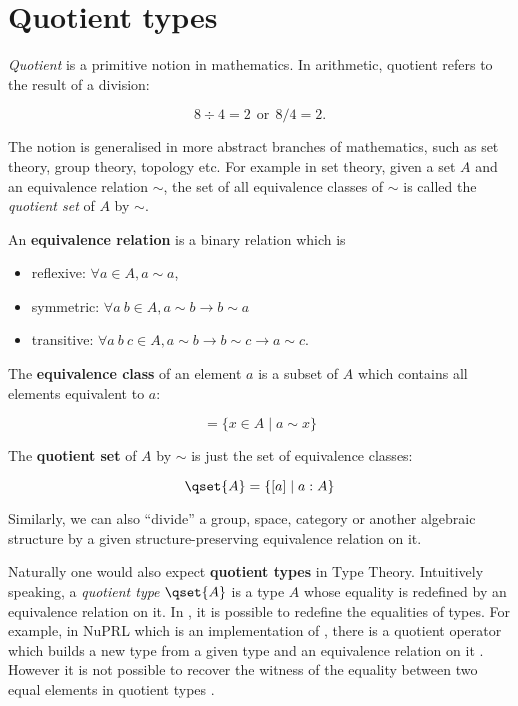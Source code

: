 



\section{Quotient types}


\emph{Quotient} is a primitive notion in mathematics. In arithmetic,
quotient refers to the result of a division:

$$8 \div 4 = 2 ~~ \text{or}~~ 8/4 = 2.$$

The notion is generalised in more abstract branches of mathematics,
such as set theory, group theory, topology etc. For example in set
theory, given a set $A$ and an equivalence relation $\sim$, the set of
all equivalence classes of $\sim$ is called the \emph{quotient set} of
$A$ by $\sim$.

An \textbf{equivalence relation} is a binary relation which is 

\begin{itemize}
\item reflexive: $\forall a \in A, a \sim a$,
\item symmetric: $\forall a~ b \in A, a \sim b \to b \sim a$
\item transitive: $\forall a ~ b~ c \in A, a \sim b \to b \sim c \to a \sim c$.
\end{itemize}

The \textbf{equivalence class} of an element $a$ is a subset of $A$
which contains all elements equivalent to $a$:

\begin{equation*}
[a] = \{x \in A \;| \; a \sim x \}
\end{equation*}

The \textbf{quotient set} of $A$ by $\sim$ is just the set of equivalence classes:

\begin{equation*}
\qset{A} = \{ [ a ] \;|\; a : A \}
\end{equation*}

Similarly, we can also ``divide'' a group, space, category or another
algebraic structure by a given structure-preserving equivalence
relation on it.

Naturally one would also expect \textbf{quotient types} in Type
Theory. Intuitively speaking, a \emph{quotient type} $\qset{A}$ is a
type $A$ whose equality is redefined by an equivalence relation on
it. In \ett, it is possible to redefine the equalities of types.  For
example, in NuPRL which is an implementation of \ett, there is a
quotient operator which builds a new type from a given type and an
equivalence relation on it \cite{DBLP:books/daglib/0068834}. However
it is not possible to recover the witness of the equality between two
equal elements in quotient types \cite{nog:02}.


